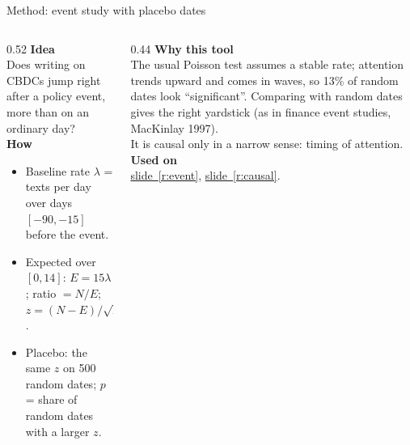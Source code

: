 \documentclass[aspectratio=169,10pt]{beamer}
\newcommand{\usedon}[1]{\hyperref[#1]{\textcolor{c4}{slide~\ref*{#1}}}}
\newcommand{\mhead}[1]{\textcolor{c1}{\textbf{#1}}\\[1pt]}
\begin{document}
\begin{frame}{Method: event study with placebo dates}
\begin{columns}[T]
\begin{column}{0.52\textwidth}\footnotesize
\mhead{Idea}
Does writing on CBDCs jump right after a policy event, more than on an ordinary day?\\[4pt]
\mhead{How}
\begin{itemize}\setlength\itemsep{1pt}
\item Baseline rate $\lambda$ = texts per day over days $[-90,-15]$ before the event.
\item Expected over $[0,14]$: $E = 15\lambda$; ratio $= N/E$; $z = (N-E)/\sqrt{E}$.
\item \alert{Placebo}: the same $z$ on 500 random dates; $p$ = share of random dates with a larger $z$.
\end{itemize}
\end{column}
\begin{column}{0.44\textwidth}\footnotesize
\mhead{Why this tool}
The usual Poisson test assumes a stable rate; attention trends upward and comes in waves, so 13\% of random dates look ``significant''. Comparing with random dates gives the right yardstick (as in finance event studies, MacKinlay 1997).\\[3pt]
It is causal only in a narrow sense: timing of attention.\\[6pt]
\mhead{Used on}
\usedon{r:event}, \usedon{r:causal}.
\end{column}
\end{columns}
\end{frame}
\end{document}
